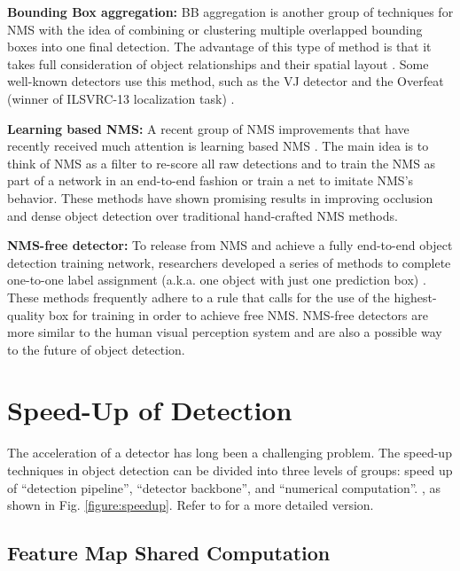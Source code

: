 \documentclass[lettersize,journal]{IEEEtran}
\begin{document}
\textbf{Bounding Box aggregation:} BB aggregation is another group of techniques for NMS \cite{CVPR01-VJ, ACCV14-NMSMessages, ICLR14-Overfeat,ICCV15-SpatSemReg} with the idea of combining or clustering multiple overlapped bounding boxes into one final detection. The advantage of this type of method is that it takes full consideration of object relationships and their spatial layout \cite{solovyev2021weighted, zheng2021enhancing}. Some well-known detectors use this method, such as the VJ detector \cite{CVPR01-VJ} and the Overfeat (winner of ILSVRC-13 localization task) \cite{ICLR14-Overfeat}.

\textbf{Learning based NMS:} A recent group of NMS improvements that have recently received much attention is learning based NMS \cite{ICCV17-LearnNMS, ACCV16-En2EnMAP, CVPR15-En2EnDPM, IJCV11-Layout, hu2018relation, tan2019learning}. The main idea is to think of NMS as a filter to re-score all raw detections and to train the NMS as part of a network in an end-to-end fashion or train a net to imitate NMS's behavior. These methods have shown promising results in improving occlusion and dense object detection over traditional hand-crafted NMS methods.

\textbf{NMS-free detector:} To release from NMS and achieve a fully end-to-end object detection training network, researchers developed a series of methods to complete one-to-one label assignment (a.k.a. one object with just one prediction box) \cite{zhou2019objects, carion2020end, wang2021end}. These methods frequently adhere to a rule that calls for the use of the highest-quality box for training in order to achieve free NMS. NMS-free detectors are more similar to the human visual perception system and are also a possible way to the future of object detection.


\section{Speed-Up of Detection}\label{sec:speedup}

The acceleration of a detector has long been a challenging problem. The speed-up techniques in object detection can be divided into three levels of groups: speed up of ``detection pipeline'', ``detector backbone'', and ``numerical computation''.
, as shown in Fig. \ref{figure:speedup}. Refer to \cite{zou2019object} for a more detailed version.

\subsection{Feature Map Shared Computation}
\end{document}
